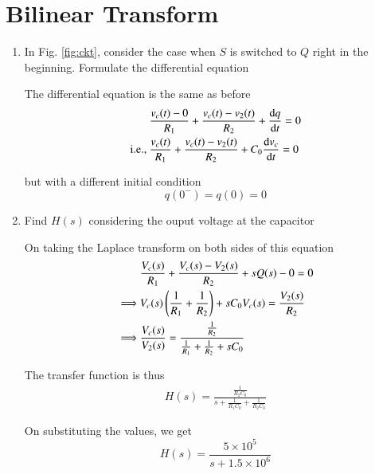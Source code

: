 \documentclass[journal,12pt,twocolumn]{IEEEtran}
\renewcommand\thesection{\arabic{section}}
\begin{document}
            \section{Bilinear Transform}
            \begin{enumerate}[label=\thesection.\arabic*.,ref=\thesection.\theenumi]
            \item In Fig. \ref{fig:ckt}, consider the case when $S$ is switched to $Q$ right in the beginning. Formulate the differential equation
            
            \solution The differential equation is the same as before 
            \begin{align}
                &\frac{v_c(t) - 0}{R_1} + \frac{v_c(t) - v_2(t)}{R_2} + \frac{\mathrm{d} q}{\mathrm{d} t} = 0 \\
                \text{i.e., } &\frac{v_c(t)}{R_1} + \frac{v_c(t) - v_2(t)}{R_2} + C_0\frac{\mathrm{d} v_c}{\mathrm{d} t} = 0
            \end{align}
            
            but with a different initial condition
            \begin{equation}
                q(0^-) = q(0) = 0
            \end{equation}
            
            \item Find $H(s)$ considering the ouput voltage at the capacitor
            
            \solution On taking the Laplace transform on both sides of this equation
            \begin{align}
                &\frac{V_c(s)}{R_1} + \frac{V_c(s) - V_2(s)}{R_2} + sQ(s) - 0 = 0 \\
                \implies &V_c(s) \left(\frac{1}{R_1} + \frac{1}{R_2}\right) + sC_0V_c(s) = \frac{V_2(s)}{R_2} \\
                \implies &\frac{V_c(s)}{V_2(s)} = \frac{\frac{1}{R_2}}{\frac{1}{R_1} + \frac{1}{R_2} + sC_0}
            \end{align}
            
            The transfer function is thus
            \begin{align}
                H(s) = \frac{\frac{1}{R_2C_0}}{s + \frac{1}{R_1C_0} + \frac{1}{R_2C_0}}
            \end{align}
            
            On substituting the values, we get
            \begin{equation}
                H(s) = \frac{5 \times 10^5}{s + 1.5 \times 10^6}
            \end{equation}
            

\end{enumerate}
\end{document}
